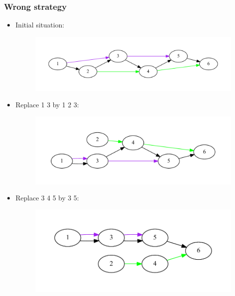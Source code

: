 \documentclass[svgnames,14pt]{beamer}
\begin{document}
\begin{frame}
\frametitle{Wrong strategy}
\begin{itemize}
\item Initial situation:
\begin{changemargin}{-1.cm}{-1.cm}
\begin{figure}
\centering
\includegraphics[scale = 0.38]{graph1.pdf}
\end{figure}
\end{changemargin}
\item Replace 1 3 by 1 2 3:
\begin{changemargin}{-1.cm}{-1.cm}
\begin{figure}
\centering
\includegraphics[scale = 0.38]{graph2.pdf}
\end{figure}
\end{changemargin}
\item Replace 3 4 5 by 3 5:
\begin{changemargin}{-1.cm}{-1.cm}
\begin{figure}
\centering
\includegraphics[scale = 0.38]{graph3.pdf}
\end{figure}
\end{changemargin}
\end{itemize}
\end{frame}
\end{document}
